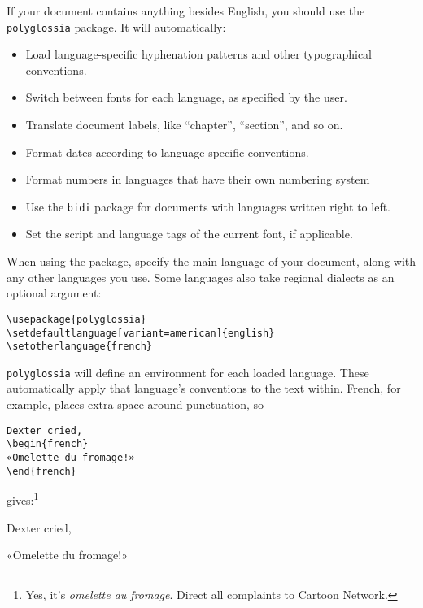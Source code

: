 If your document contains anything besides English,
you should use the \texttt{polyglossia} package.
It will automatically:
\begin{itemize}
\item Load language-specific hyphenation patterns and other typographical
    conventions.
\item Switch between fonts for each language, as specified by the user.
\item Translate document labels,
    like ``chapter''\quotekern, ``section''\quotekern, and so on.
\item Format dates according to language-specific conventions.
\item Format numbers in languages that have their own numbering system
\item Use the \texttt{bidi} package for documents with languages written
    right to left.
\item Set the script and language tags of the current font, if applicable.
\end{itemize}
When using the package, specify the main language of your document,
along with any other languages you use.
Some languages also take regional dialects as an optional argument:
\begin{leftfigure}
\begin{lstlisting}
\usepackage{polyglossia}
\setdefaultlanguage[variant=american]{english}
\setotherlanguage{french}
\end{lstlisting}
\end{leftfigure}
\texttt{polyglossia} will define an environment for each loaded language.
These automatically apply that language's conventions to the text within.
French, for example, places extra space around punctuation, so
\begin{leftfigure}
\begin{lstlisting}
Dexter cried,
\begin{french}
«Omelette du fromage!»
\end{french}
\end{lstlisting}
\end{leftfigure}
gives:\footnote{Yes, it's \emph{omelette au fromage}.
Direct all complaints to Cartoon Network.}
\begin{leftfigure}
Dexter cried,
\begin{french}
«Omelette du fromage!»
\end{french}
\end{leftfigure}


